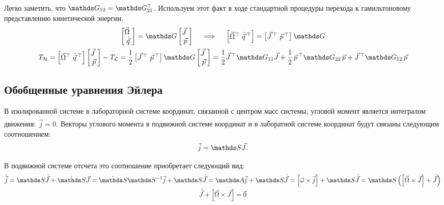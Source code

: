 Легко заметить, что $\bbG_{12} = \bbG_{21}^{\top}$. Используем этот факт в ходе стандартной процедуры перехода к гамильтоновому представлению кинетической энергии.
\vverh
\begin{gather}
\begin{bmatrix}
\vec{\Omega} \ \\
\dot{\vec{q}} 
\end{bmatrix}
= \bbG
\begin{bmatrix}
\vec{J} \ \\
\vec{p}
\end{bmatrix}
\quad \implies \quad
\begin{bmatrix}
\vec{\Omega}^{\top} \ \dot{\vec{q}}^{\, \top}
\end{bmatrix}
= 
\begin{bmatrix}
\vec{J}^{\, \top} \ \vec{p}^{\, \top}
\end{bmatrix}
\bbG \notag \\
T_\mathcal{H} = 
\begin{bmatrix}
\vec{\Omega}^{\top} \ \dot{\vec{q}}^{\, \top}
\end{bmatrix}
\begin{bmatrix}
\vec{J} \ \\
\vec{p}
\end{bmatrix} 
- T_\mathcal{L} = \frac{1}{2} 
\begin{bmatrix}
\vec{J}^{\, \top} \ \vec{p}^{\, \top}
\end{bmatrix} 
\bbG
\begin{bmatrix}
\vec{J} \ \\
\vec{p}
\end{bmatrix} = 
\frac{1}{2} \vec{J}^{\, \top} \bbG_{11} \vec{J} + \frac{1}{2} \, \vec{p}^{\, \top} \bbG_{22} \, \vec{p} + \vec{J}^{\, \top} \bbG_{12} \, \vec{p} \notag
\end{gather}

\subsection{Обобщенные уравнения Эйлера}
В изолированной системе в лабораторной системе координат, связанной с центром масс системы, угловой момент является интегралом движения: $\dot{\vec{j}} = 0$. Векторы углового момента в подвижной системе координат и в лаборатной системе координат будут связаны следующим соотношением: 
\vverh
\begin{gather}
\vec{j} = \bbS \vec{J}. \label{j1}
\end{gather} 

В подвижной системе отсчета это соотношение приобретает следующий вид:
\vverh
\begin{gather}
\dot{\vec{j}} = \bbS \dot{\vec{J}} + \dot{\bbS} \vec{J} = \dot{\bbS} \bbS^{-1} \vec{j} + \bbS \dot{\vec{J}} = \bbA \vec{j} + \bbS \dot{\vec{J}} =  \left[ \vec{\omega} \times \vec{j} \right] + \bbS \dot{\vec{J}} = \bbS \left( \left[ \vec{\Omega} \times \vec{J} \right] + \dot{\vec{J}} \right) \notag \\
\dot{\vec{J}} + \left[ \vec{\Omega} \times \vec{J} \right] = \vec{0} \label{j2}
\end{gather}


